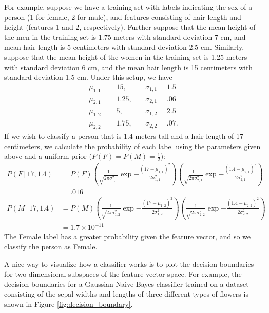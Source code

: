 For example, suppose we have a training set with labels indicating the sex of a person (1 for female, 2 for male), and  features consisting of hair length and height (features 1 and 2, respectively).
Further suppose that the mean height of the men in the training set is 1.75 meters with standard deviation 7 cm, and mean hair length is 5 centimeters with standard deviation 2.5 cm.
Similarly, suppose that the mean height of the women in the training set is 1.25 meters with standard deviation 6 cm, and the mean hair length is 15 centimeters with standard deviation 1.5 cm.
Under this setup, we have
\begin{align*}
\mu_{1,1} &= 15, \quad &&\sigma_{1,1} = 1.5\\
\mu_{2,1} &= 1.25, &&\sigma_{2,1} = .06\\
\mu_{1,2} &= 5, &&\sigma_{1,2} = 2.5\\
\mu_{2,2} &= 1.75, &&\sigma_{2,2} = .07.
\end{align*}
If we wish to classify a person that is 1.4 meters tall and a hair length of 17 centimeters, we calculate the probability of each label using the parameters given above and a uniform prior ($P(F) = P(M) = \frac{1}{2}$):
\begin{align*}
P(F\,|\,17,1.4) &= P(F)\left(\frac{1}{\sqrt{2\pi\sigma_{1,1}^2}}\exp{-\frac{(17-\mu_{1,1})^2}{2\sigma^2_{1,1}}}\right)
\left(\frac{1}{\sqrt{2\pi\sigma_{2,1}^2}}\exp{-\frac{(1.4-\mu_{2,1})^2}{2\sigma^2_{2,1}}}\right)\\
&= .016\\
P(M\,|\,17,1.4) &= P(M)\left(\frac{1}{\sqrt{2\pi\sigma_{1,2}^2}}\exp{-\frac{(17-\mu_{1,2})^2}{2\sigma^2_{1,2}}}\right)
\left(\frac{1}{\sqrt{2\pi\sigma_{2,2}^2}}\exp{-\frac{(1.4-\mu_{2,2})^2}{2\sigma^2_{2,2}}}\right)\\
&= 1.7\times 10^{-11}
\end{align*}
The Female label has a greater probability given the feature vector, and so we classify the person as Female.

A nice way to visualize how a classifier works is to plot the decision boundaries for two-dimensional subspaces of the
feature vector space.
For example, the decision boundaries for a Gaussian Naive Bayes classifier trained on a dataset consisting of the 
sepal widths and lengths of three different types of flowers is shown in Figure \ref{fig:decision_boundary}.

